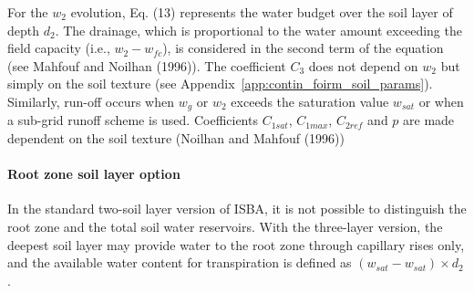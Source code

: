 For the $w_2$ evolution,
Eq. (13) represents the water budget over the soil
layer of depth $d_2$.  The drainage, which is proportional to the water
amount exceeding the field capacity (i.e., $w_2-w_{fc}$),
is considered in the second term of the equation (see
Mahfouf and Noilhan (1996)\nocite{Mahfouf1996}).  The coefficient $C_3$ does not depend
on $w_2$ but simply on the soil texture (see Appendix~\ref{app:contin_foirm_soil_params}).  Similarly,
run-off occurs when $w_g$ or $w_2$ exceeds the saturation
value $w_{sat}$ or when a sub-grid runoff scheme is used. Coefficients 
$C_{1sat}$, $C_{1max}$, $C_{2ref}$ and $p$ are made dependent on the soil 
texture (Noilhan and Mahfouf (1996)\nocite{Noilhan1996})

\paragraph{Root zone soil layer option}

In the standard two-soil layer version of ISBA, it is not possible
to distinguish the root zone and the total soil water reservoirs.
With the three-layer version,
the deepest soil layer may provide water
to the root zone through capillary rises only, and the available
water content for transpiration is defined as $(w_{sat}-w_{sat})\times d_2$.

